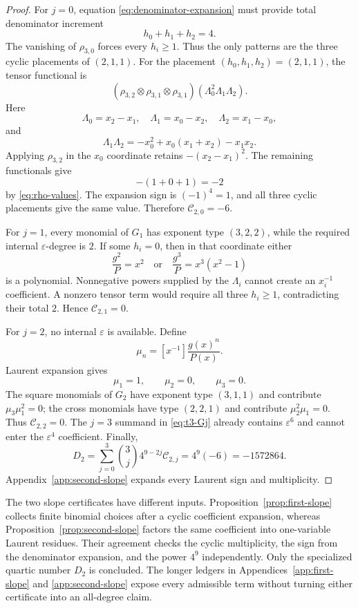 \documentclass[11pt]{article}
\theoremstyle{definition}
\begin{document}
{\begin{proof}
For $j=0$, equation \eqref{eq:denominator-expansion} must provide total denominator increment
\[
h_0+h_1+h_2=4.
\]
The vanishing of $\rho_{3,0}$ forces every $h_i\ge1$. Thus the only patterns are the three cyclic placements of $(2,1,1)$. For the placement $(h_0,h_1,h_2)=(2,1,1)$, the tensor functional is
\[
(\rho_{3,2}\otimes\rho_{3,1}\otimes\rho_{3,1})
(\Lambda_0^2\Lambda_1\Lambda_2).
\]
Here
\[
\Lambda_0=x_2-x_1,
\quad
\Lambda_1=x_0-x_2,
\quad
\Lambda_2=x_1-x_0,
\]
and
\[
\Lambda_1\Lambda_2
=-x_0^2+x_0(x_1+x_2)-x_1x_2.
\]
Applying $\rho_{3,2}$ in the $x_0$ coordinate retains $-(x_2-x_1)^2$. The remaining functionals give
\[
-(1+0+1)=-2
\]
by \eqref{eq:rho-values}. The expansion sign is $(-1)^4=1$, and all three cyclic placements give the same value. Therefore $\mathcal C_{2,0}=-6$.

For $j=1$, every monomial of $G_1$ has exponent type $(3,2,2)$, while the required internal $\varepsilon$-degree is $2$. If some $h_i=0$, then in that coordinate either
\[
\frac{g^2}{P}=x^2
\quad\text{or}\quad
\frac{g^3}{P}=x^3(x^2-1)
\]
is a polynomial. Nonnegative powers supplied by the $\Lambda_i$ cannot create an $x_i^{-1}$ coefficient. A nonzero tensor term would require all three $h_i\ge1$, contradicting their total $2$. Hence $\mathcal C_{2,1}=0$.

For $j=2$, no internal $\varepsilon$ is available. Define
\[
\mu_n=[x^{-1}]\frac{g(x)^n}{P(x)}.
\]
Laurent expansion gives
\begin{equation}
\mu_1=1,
\qquad
\mu_2=0,
\qquad
\mu_3=0.
\label{eq:mu-values}
\end{equation}
The square monomials of $G_2$ have exponent type $(3,1,1)$ and contribute $\mu_3\mu_1^2=0$; the cross monomials have type $(2,2,1)$ and contribute $\mu_2^2\mu_1=0$. Thus $\mathcal C_{2,2}=0$. The $j=3$ summand in \eqref{eq:t3-Gj} already contains $\varepsilon^6$ and cannot enter the $\varepsilon^4$ coefficient. Finally,
\[
D_2
=
\sum_{j=0}^3\binom3j4^{9-2j}\mathcal C_{2,j}
=4^9(-6)
=-1572864.
\]
Appendix~\ref{app:second-slope} expands every Laurent sign and multiplicity.
\end{proof}

The two slope certificates have different inputs. Proposition~\ref{prop:first-slope} collects finite binomial choices after a cyclic coefficient expansion, whereas Proposition~\ref{prop:second-slope} factors the same coefficient into one-variable Laurent residues. Their agreement checks the cyclic multiplicity, the sign from the denominator expansion, and the power $4^9$ independently. Only the specialized quartic number $D_2$ is concluded. The longer ledgers in Appendices~\ref{app:first-slope} and \ref{app:second-slope} expose every admissible term without turning either certificate into an all-degree claim.

}
\end{document}
